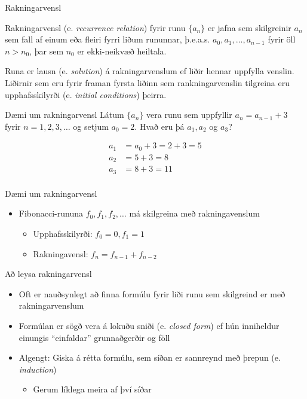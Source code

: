\documentclass{beamer}
\begin{document}
\begin{frame}{Rakningarvensl}
\begin{tcolorbox}[title=Rakningarvensl]
Rakningarvensl (e. \emph{recurrence relation}) fyrir runu $\{a_n\}$ er jafna sem skilgreinir $a_n$ sem fall af einum eða fleiri fyrri liðum rununnar, þ.e.a.s. $a_0, a_1, \ldots, a_{n-1}$ fyrir öll $n > n_0$, þar sem $n_0$ er ekki-neikvæð heiltala.
\end{tcolorbox}
Runa er lausn (e. \emph{solution}) á rakningarvenslum ef liðir hennar uppfylla venslin. Liðirnir sem eru fyrir framan fyrsta liðinn sem rankningarvenslin tilgreina eru upphafsskilyrði (e. \emph{initial conditions}) þeirra.
\end{frame}

\begin{frame}{Dæmi um rakningarvensl}
Látum $\{a_n\}$ vera runu sem uppfyllir $a_n = a_{n-1} + 3$ fyrir $n=1, 2, 3, \ldots$ og setjum $a_0 = 2$. Hvað eru þá $a_1, a_2$ og $a_3$? \pause

\begin{align*}
a_1 &= a_0 + 3 = 2 + 3 = 5\\
a_2 &= 5 + 3 = 8\\
a_3 &= 8 + 3 = 11\\
\end{align*}

\end{frame}

\begin{frame}{Dæmi um rakningarvensl}
\begin{itemize}
 \item Fibonacci-rununa $f_0, f_1, f_2, \ldots$ má skilgreina með rakningavenslum
 \begin{itemize}
  \item Upphafsskilyrði: $f_0 = 0, f_1 = 1$
  \item Rakningavensl: $f_n = f_{n-1} + f_{n-2}$
 \end{itemize}
\end{itemize}
\end{frame}

\begin{frame}{Að leysa rakningarvensl}
\begin{itemize}
 \item Oft er nauðsynlegt að finna formúlu fyrir liði runu sem skilgreind er með rakningarvenslum
 \item Formúlan er sögð vera á lokuðu sniði (e. \emph{closed form}) ef hún inniheldur einungis ``einfaldar'' grunnaðgerðir og föll
 \item Algengt: Giska á rétta formúlu, sem síðan er sannreynd með þrepun (e. \emph{induction})
 \begin{itemize}
  \item Gerum líklega meira af því síðar
 \end{itemize}
\end{itemize}
\end{frame}
\end{document}
